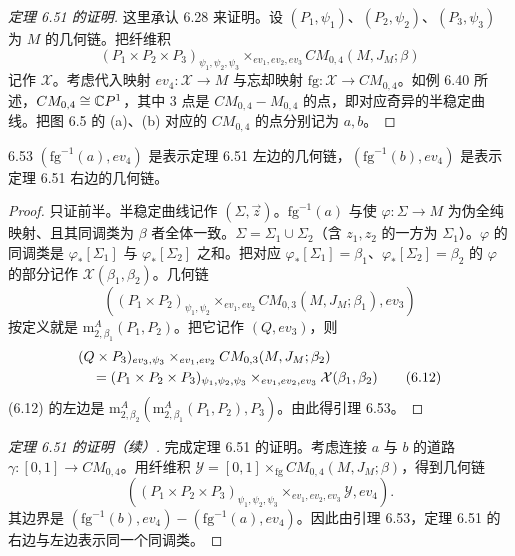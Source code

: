 \begin{proof}[定理 6.51 的证明]
  这里承认 6.28 来证明。设 $(P_1,\psi_1)$、$(P_2,\psi_2)$、$(P_3,\psi_3)$ 为 $M$ 的几何链。把纤维积
  \[
    (P_1\times P_2\times P_3)_{\psi_1,\psi_2,\psi_3}\times_{ev_1,ev_2,ev_3}CM_{0,4}(M,J_M;\beta)
  \]
  记作 $\mathcal X$。考虑代入映射 $ev_4:\mathcal X\to M$ 与忘却映射 $\mathrm{fg}:\mathcal X\to CM_{0,4}$。如例 6.40 所述，$CM_{0,4}\cong\mathbb{C}P^1$，其中 3 点是 $CM_{0,4}-M_{0,4}$ 的点，即对应奇异的半稳定曲线。把图 6.5 的 (a)、(b) 对应的 $CM_{0,4}$ 的点分别记为 $a,b$。
\end{proof}

\begin{lemma*}{6.53}
  $(\mathrm{fg}^{-1}(a),ev_4)$ 是表示定理 6.51 左边的几何链，$(\mathrm{fg}^{-1}(b),ev_4)$ 是表示定理 6.51 右边的几何链。
\end{lemma*}
\begin{proof}
  只证前半。半稳定曲线记作 $(\Sigma,\vec z)$。$\mathrm{fg}^{-1}(a)$ 与使 $\varphi:\Sigma\to M$ 为伪全纯映射、且其同调类为 $\beta$ 者全体一致。$\Sigma=\Sigma_1\cup\Sigma_2$（含 $z_1,z_2$ 的一方为 $\Sigma_1$）。$\varphi$ 的同调类是 $\varphi_*[\Sigma_1]$ 与 $\varphi_*[\Sigma_2]$ 之和。把对应 $\varphi_*[\Sigma_1]=\beta_1$、$\varphi_*[\Sigma_2]=\beta_2$ 的 $\varphi$ 的部分记作 $\mathcal X(\beta_1,\beta_2)$。几何链
  \[
    \left((P_1\times P_2)_{\psi_1,\psi_2}\times_{ev_1,ev_2}CM_{0,3}(M,J_M;\beta_1),ev_3\right)
  \]
  按定义就是 $\mathrm{m}_{2,\beta_1}^A(P_1,P_2)$。把它记作 $(Q,ev_3)$，则
  \begin{align}
    &(Q\times P_3)_{ev_3,\psi_3}\times_{ev_1,ev_2}CM_{0,3}(M,J_M;\beta_2) \notag\\
    &\quad=(P_1\times P_2\times P_3)_{\psi_1,\psi_2,\psi_3}\times_{ev_1,ev_2,ev_3}\mathcal X(\beta_1,\beta_2) \tag{6.12}
  \end{align}
  (6.12) 的左边是 $\mathrm{m}_{2,\beta_2}^A(\mathrm{m}_{2,\beta_1}^A(P_1,P_2),P_3)$。由此得引理 6.53。
\end{proof}

\begin{proof}[定理 6.51 的证明（续）]
  完成定理 6.51 的证明。考虑连接 $a$ 与 $b$ 的道路 $\gamma:[0,1]\to CM_{0,4}$。用纤维积 $\mathcal Y=[0,1]\times_{\mathrm{fg}}CM_{0,4}(M,J_M;\beta)$，得到几何链
  \[
    \left((P_1\times P_2\times P_3)_{\psi_1,\psi_2,\psi_3}\times_{ev_1,ev_2,ev_3}\mathcal Y,ev_4\right).
  \]
  其边界是 $(\mathrm{fg}^{-1}(b),ev_4)-(\mathrm{fg}^{-1}(a),ev_4)$。因此由引理 6.53，定理 6.51 的右边与左边表示同一个同调类。
\end{proof}

